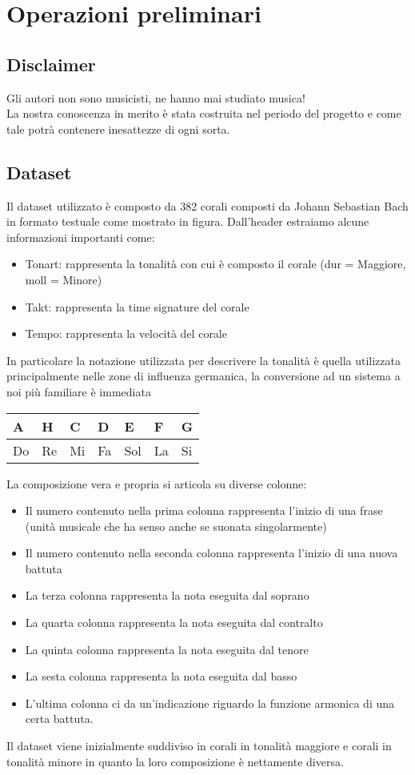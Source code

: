 \chapter{Operazioni preliminari}\label{ch:th-music}

\section{Disclaimer}
Gli autori non sono musicisti, ne hanno mai studiato musica! \\
La nostra conoscenza in merito è stata costruita nel periodo del progetto e come tale potrà contenere inesattezze di ogni sorta.

\section{Dataset}
Il dataset utilizzato è composto da 382 corali composti da Johann Sebastian Bach in formato testuale come mostrato in figura.
Dall'header estraiamo alcune informazioni importanti come:
\begin{itemize}
\item Tonart: rappresenta la tonalità con cui è composto il corale (dur = Maggiore, moll = Minore)
\item Takt: rappresenta la time signature del corale
\item Tempo: rappresenta la velocità del corale
\end{itemize}
In particolare la notazione utilizzata per descrivere la tonalità è quella utilizzata principalmente nelle zone di influenza germanica, la conversione ad un sistema a noi più familiare è immediata
\begin{table}[H]
\centering
\begin{tabular}{|l|l|l|l|l|l|l|}
\hline
A  & H  & C  & D  & E   & F  & G  \\ \hline
Do & Re & Mi & Fa & Sol & La & Si \\ \hline
\end{tabular}
\end{table}
\noindent
La composizione vera e propria si articola su diverse colonne:
\begin{itemize}
\item Il numero contenuto nella prima colonna rappresenta l'inizio di una frase (unità musicale che ha senso anche se suonata singolarmente)
\item Il numero contenuto nella seconda colonna rappresenta l'inizio di una nuova battuta
\item La terza colonna rappresenta la nota eseguita dal soprano
\item La quarta colonna rappresenta la nota eseguita dal contralto
\item La quinta colonna rappresenta la nota eseguita dal tenore
\item La sesta colonna rappresenta la nota eseguita dal basso
\item L'ultima colonna ci da un'indicazione riguardo la funzione armonica di una certa battuta.
\end{itemize}
\noindent
Il dataset viene inizialmente suddiviso in corali in tonalità maggiore e corali in tonalità minore in quanto la loro composizione è nettamente diversa.


